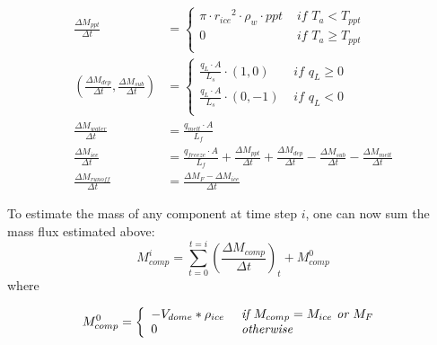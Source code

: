 \documentclass[utf8]{frontiersSCNS} %
\begin{document}
\begin{subequations}
\label{equations}
\begin{align}
    \label{eq:ppt} 
    \frac{\Delta M_{ppt}}{\Delta t}  &= \left\{ \begin{array}{ll} \pi \cdot {r_{ice}}^2 \cdot
\rho_{w}\cdot ppt& \textit{ if } T_{a} < T_{ppt} \\ 0 & \textit{ if } T_{a} \geq T_{ppt} \\ \end{array} \right. \\
    \label{eq:vap} 
            (\frac{\Delta M_{dep}}{\Delta t}, \frac{\Delta M_{sub}}{\Delta t}) &= \left\{ \begin{array}{ll} \frac{q_{L}
                        \cdot A}{L_s}\cdot (1,0)& \textit{ if } q_{L} \geq 0 \\ \frac{q_{L}
            \cdot A}{L_s}\cdot (0,-1) & \textit{ if } q_{L} < 0 \\ \end{array} \right. \\
    \label{eq:mwat} 
            \frac{\Delta M_{water}}{\Delta t} &= \frac{q_{melt} \cdot A }{L_f}\\
    \label{eq:mice} 
    \frac{\Delta M_{ice}}{\Delta t} &= \frac{q_{freeze}\cdot A }{L_f} + \frac{\Delta M_{ppt}}{\Delta t} + \frac{\Delta
    M_{dep}}{\Delta t}- \frac{\Delta M_{sub}}{\Delta t}- \frac{\Delta M_{melt}}{\Delta t} \\
    \label{eq:mftn} 
        \frac{\Delta M_{runoff}}{\Delta t} &= \frac{\Delta M_{F} - \Delta M_{ice}}{\Delta t}
\end{align}
\end{subequations}

To estimate the mass of any component at time step $i$, one can now sum the mass flux estimated above:
\begin{equation} M_{comp}^i = \sum_{t=0}^{t=i} (\frac{\Delta M_{comp}}{\Delta t})_{t} + M_{comp}^0 \end{equation}
where 

\begin{equation} M_{comp}^0 = \left\{ \begin{array}{ll} -V_{dome} * \rho_{ice} & \textit{ if } M_{comp}=
        M_{ice}\textit{ or }
M_{F}\\ 0 & \textit{ otherwise }\\ \end{array} \right. \\
 \end{equation}
\end{document}
